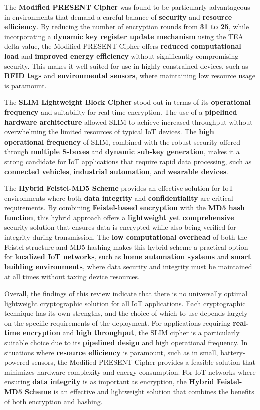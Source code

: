\documentclass{article}
\begin{document}
The \textbf{Modified PRESENT Cipher} was found to be particularly advantageous in environments that demand a careful balance of \textbf{security} and \textbf{resource efficiency}. By reducing the number of encryption rounds from \textbf{31 to 25}, while incorporating a \textbf{dynamic key register update mechanism} using the TEA delta value, the Modified PRESENT Cipher offers \textbf{reduced computational load} and \textbf{improved energy efficiency} without significantly compromising security. This makes it well-suited for use in highly constrained devices, such as \textbf{RFID tags} and \textbf{environmental sensors}, where maintaining low resource usage is paramount.

The \textbf{SLIM Lightweight Block Cipher} stood out in terms of its \textbf{operational frequency} and suitability for real-time encryption. The use of a \textbf{pipelined hardware architecture} allowed SLIM to achieve increased throughput without overwhelming the limited resources of typical IoT devices. The \textbf{high operational frequency} of SLIM, combined with the robust security offered through \textbf{multiple S-boxes} and \textbf{dynamic sub-key generation}, makes it a strong candidate for IoT applications that require rapid data processing, such as \textbf{connected vehicles}, \textbf{industrial automation}, and \textbf{wearable devices}.

The \textbf{Hybrid Feistel-MD5 Scheme} provides an effective solution for IoT environments where both \textbf{data integrity} and \textbf{confidentiality} are critical requirements. By combining \textbf{Feistel-based encryption} with the \textbf{MD5 hash function}, this hybrid approach offers a \textbf{lightweight yet comprehensive} security solution that ensures data is encrypted while also being verified for integrity during transmission. The \textbf{low computational overhead} of both the Feistel structure and MD5 hashing makes this hybrid scheme a practical option for \textbf{localized IoT networks}, such as \textbf{home automation systems} and \textbf{smart building environments}, where data security and integrity must be maintained at all times without taxing device resources.

Overall, the findings of this review indicate that there is no universally optimal lightweight cryptographic solution for all IoT applications. Each cryptographic technique has its own strengths, and the choice of which to use depends largely on the specific requirements of the deployment. For applications requiring \textbf{real-time encryption} and \textbf{high throughput}, the SLIM cipher is a particularly suitable choice due to its \textbf{pipelined design} and high operational frequency. In situations where \textbf{resource efficiency} is paramount, such as in small, battery-powered sensors, the Modified PRESENT Cipher provides a feasible solution that minimizes hardware complexity and energy consumption. For IoT networks where ensuring \textbf{data integrity} is as important as encryption, the \textbf{Hybrid Feistel-MD5 Scheme} is an effective and lightweight solution that combines the benefits of both encryption and hashing.
\end{document}

